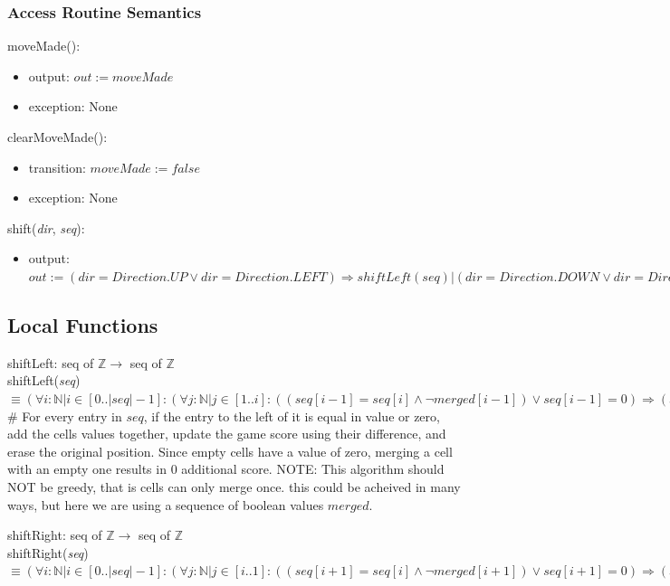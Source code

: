 \documentclass{article}
\begin{document}
		\subsubsection*{Access Routine Semantics}
			\noindent moveMade():
			\begin{itemize}
				\item output: $out := moveMade$
				\item exception: None
			\end{itemize}

			\noindent clearMoveMade():
			\begin{itemize}
				\item transition: $moveMade := false$
				\item exception: None
			\end{itemize}

			\noindent shift(\textit{dir}, \textit{seq}):
			\begin{itemize}
				\item output: $out := (dir = Direction.UP \vee dir = Direction.LEFT) \Rightarrow shiftLeft(seq) | (dir = Direction.DOWN \vee dir = Direction.RIGHT) \Rightarrow shiftRight(seq)$
			\end{itemize}

	\subsection*{Local Functions}
		\noindent shiftLeft: seq of $\mathbb{Z} \rightarrow$ seq of $\mathbb{Z}$\\
		\noindent shiftLeft(\textit{seq}) $\equiv (\forall i : \mathbb{N} | i \in [0..|seq|-1] : (\forall j : \mathbb{N} | j \in [1..i] : ((seq[i-1] = seq[i] \wedge \neg merged[i-1]) \vee seq[i-1] = 0) \Rightarrow (seq[i-1] := seq[i-1] + seq[i], Score.updateScore(seq[i-1]-seq[i]), seq[i] := 0)))$\\

		\noindent \# For every entry in $seq$, if the entry to the left of it is equal in value or zero, add the cells values together, update the game score using their difference, and erase the original position. Since empty cells have a value of zero, merging a cell with an empty one results in 0 additional score. NOTE: This algorithm should NOT be greedy, that is cells can only merge once. this could be acheived in many ways, but here we are using a sequence of boolean values $merged$.

		\bigskip

		\noindent shiftRight: seq of $\mathbb{Z} \rightarrow$ seq of $\mathbb{Z}$\\
		\noindent shiftRight(\textit{seq}) $\equiv (\forall i : \mathbb{N} | i \in [0..|seq|-1] : (\forall j : \mathbb{N} | j \in [i..1] : ((seq[i+1] = seq[i] \wedge \neg merged[i+1]) \vee seq[i+1] = 0) \Rightarrow (seq[i+1] := seq[i+1] +  seq[i], Score.updateScore(seq[i+1]-seq[i]), seq[i] := 0)))$\\
\end{document}
